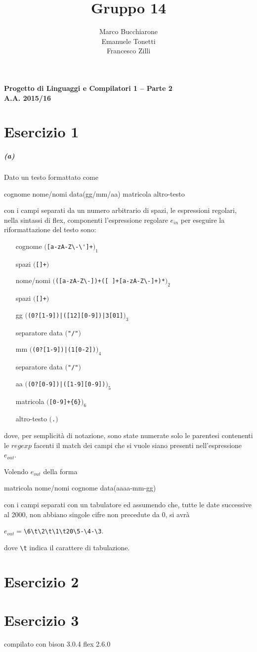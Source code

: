 \documentclass[a4paper,oneside,11pt]{article}
\makeatletter
\renewcommand\and{\\}
\renewcommand\maketitle{%
\bigskip\bigskip\bigskip\bigskip%
\begin{center}\bfseries\large%
Progetto di Linguaggi e Compilatori 1 -- Parte 2 \\ A.A. 2015/16\\%
\end{center}%
\bigskip%
\begin{center}\bfseries\LARGE \@title  \end{center}%
\bigskip%
\begin{center}\bfseries\large \@author \end{center}%
\bigskip\bigskip}
\makeatother
\begin{document}
\title{Gruppo 14}
\author{Marco Bucchiarone \and Emanuele Tonetti \and Francesco Zilli}
\maketitle
%
\section*{Esercizio 1}
\subparagraph*{(a)}
Dato un testo formattato come 
\begin{center}
cognome  nome/nomi  data(gg/mm/aa)  matricola  altro-testo
\end{center}
con i campi separati da un numero arbitrario di spazi, le espressioni regolari, nella sintassi di flex, componenti l'espressione regolare $e_{in}$ per eseguire la riformattazione del testo sono:
\begin{itemize}
	\item[cognome]		$($\Verb/[a-zA-Z\-\']+/$)_{1}$
	\item[spazi]		$($\texttt{[\textvisiblespace]+}$)$
	\item[nome/nomi]	$($\Verb/([a-zA-Z\-])+([ ]+[a-zA-Z\-]+)*/$)_{2}$
	\item[spazi]		$($\texttt{[\textvisiblespace]+}$)$
	\item[gg]		$($\Verb/(0?[1-9])|([12][0-9])|3[01]/$)_{3}$ 
	\item[separatore data]	$($\Verb!"/"!$)$ 
	\item[mm]		$($\Verb/(0?[1-9])|(1[0-2])/$)_{4}$ 
	\item[separatore data]	$($\Verb!"/"!$)$ 
	\item[aa]		$($\Verb/(0?[0-9])|([1-9][0-9])/$)_{5}$ 
	\item[matricola]	$($\Verb/[0-9]+{6}/$)_{6}$ 
	\item[altro-testo]	$($\Verb/./$)$ 
\end{itemize}
dove, per semplicità di notazione, sono state numerate solo le parentesi contenenti le $regexp$ facenti il match dei campi che si vuole siano presenti nell'espressione $e_{out}$.
\par
Volendo $e_{out}$ della forma
\begin{center}
	matricola nome/nomi cognome data(aaaa-mm-gg)
\end{center}
con i campi separati con un tabulatore ed assumendo che, tutte le date successive al 2000, non abbiano singole cifre non precedute da 0, si avrà
\begin{center}
	$e_{out}=$\Verb!\6\t\2\t\1\t20\5-\4-\3!.
\end{center}
dove \Verb!\t! indica il carattere di tabulazione.
\par

\section*{Esercizio 2}
\section*{Esercizio 3}
compilato con bison 3.0.4
flex 2.6.0
\end{document}
